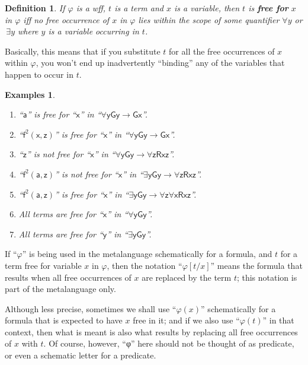 \documentclass[12pt]{report}
\theoremstyle{nonumberplain}
\newtheorem{definition}{Definition}
\newtheorem{exs}{Examples}
\newcommand{\defm}[1]{\textbf{#1}\index{#1}}
\renewcommand{\o}[1]{\mathsf{#1}}
\begin{document}
\begin{definition}
If $φ$ is a wff, $t$  is a term and $x$ is a variable, then $t$  is \defm{free for} $x$ in $φ$ iff no free occurrence of $x$ in $φ$ lies within the scope of some quantifier $∀y$ or \,$∃y$ where $y$ is a variable occurring in $t$.
\end{definition}
Basically, this means that if you substitute $t$ for all the free occurrences of $x$ within $φ$, you won't end up inadvertently ``binding'' any of the variables that happen to occur in $t$.

\begin{exs} ~\\ \vspace*{-1\baselineskip}
\begin{enumerate}[label=\arabic*.]
\item ``$\o{a}$'' is free for ``$\o{x}$'' in ``$∀{\o{y}} \o{G}\o{y} →  \o{G}\o{x}$''.

\item ``$\o{f}^2(\o{x}, \o{z})$'' is free for ``$\o{x}$'' in ``$∀{\o{y}} \o{G}\o{y} →  \o{G}\o{x}$''.

\item ``$\o{z}$'' is \emph{not} free for ``$\o{x}$'' in ``$∀{\o{y}} \o{G}\o{y} →  ∀{\o{z}} \o{R}\o{xz}$''.

\item \raggedright``$\o{f}^2(\o{a}, \o{z})$'' is not free for ``$\o{x}$'' in ``$∃{\o{y}} \o{G}\o{y} →  ∀{\o{z}} \o{R}\o{xz}$''.

\item \raggedright``$\o{f}^2(\o{a}, \o{z})$'' is free for ``$\o{x}$'' in ``$∃{\o{y}} \o{G}\o{y} →  ∀{\o{z}} ∀{\o{x}} \o{R}\o{xz}$''.

\item All terms are free for ``$\o{x}$'' in ``$∀{\o{y}} \o{G}\o{y}$''.

\item All terms are free for ``$\o{y}$'' in ``$∃{\o{y}} \o{G}\o{y}$''.
\end{enumerate}
\end{exs}

\noindent If ``$φ$'' is being used in the metalanguage schematically for a formula, and $t$ for a term free for variable $x$ in $φ$, then the notation ``$φ[t/x]$'' means the formula that results when all free occurrences of $x$ are replaced by the term $t$; this notation is part of the metalanguage only.

Although less precise, sometimes we shall use ``$φ(x)$'' schematically for a formula that is expected to have $x$ free in it; and if we also use ``$φ(t)$'' in that context, then what is meant is also what results by replacing all free occurrences of $x$ with $t$. Of course, however, ``φ'' here should not be thought of as predicate, or even a schematic letter for a predicate.
\end{document}
